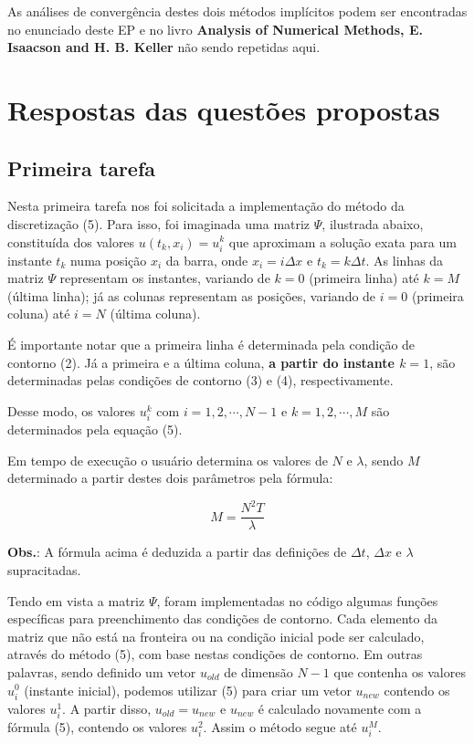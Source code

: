\documentclass[a4paper, 12pt]{article}
\begin{document}
As análises de convergência destes dois métodos implícitos podem ser encontradas no enunciado deste EP e no livro \textbf{Analysis of Numerical Methods, E. Isaacson and H. B. Keller} não sendo repetidas aqui.


\section{Respostas das questões propostas}

\subsection{Primeira tarefa}

Nesta primeira tarefa nos foi solicitada a implementação do método da discretização (5). Para isso, foi imaginada uma matriz $\Psi$, ilustrada abaixo, constituída dos valores $u(t_k, x_i)=u_i^k$ que aproximam a solução exata para um instante $t_k$ numa posição $x_i$ da barra, onde $x_i = i \Delta x$ e $t_k = k \Delta t$. As linhas da matriz $\Psi$ representam os instantes, variando de $k=0$ (primeira linha) até $k=M$ (última linha); já as colunas representam as posições, variando de $i=0$ (primeira coluna) até $i=N$ (última coluna). 

É importante notar que a primeira linha é determinada pela condição de contorno (2). Já a primeira e a última coluna, \textbf{a partir do instante $k=1$}, são determinadas pelas condições de contorno (3) e (4), respectivamente. 

Desse modo, os valores $u_i^k$ com $i=1, 2,\cdots, N-1$ e $k=1,2,\cdots, M$ são determinados pela equação (5).

Em tempo de execução o usuário determina os valores de $N$ e $\lambda$, sendo $M$ determinado a partir destes dois parâmetros pela fórmula:

$$M=\frac{N^{2}T}{\lambda}$$

\textbf{Obs.}: A fórmula acima é deduzida a partir das definições de $\Delta t$, $\Delta x$ e $\lambda$ supracitadas.

Tendo em vista a matriz $\Psi$, foram implementadas no código algumas funções específicas para preenchimento das condições de contorno. Cada elemento da matriz que não está na fronteira ou na condição inicial pode ser calculado, através do método (5), com base nestas condições de contorno. Em outras palavras, sendo definido um vetor $u_{old}$ de dimensão $N-1$ que contenha os valores $u_i^0$ (instante inicial), podemos utilizar (5) para criar um vetor $u_{new}$ contendo os valores $u_{i}^{1}$. A partir disso, $u_{old} = u_{new}$ e $u_{new}$ é calculado novamente com a fórmula (5), contendo os valores  $u_i^2$. Assim o método segue até $u_i^M$.
\end{document}
